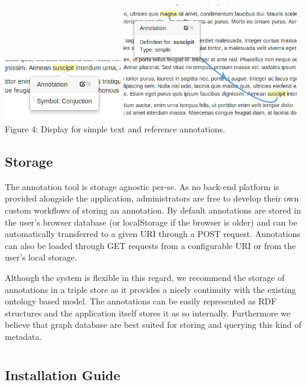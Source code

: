 \documentclass[a4paper, 12pt, notitlepage]{report}
\begin{document}
\begin{center}
\includegraphics[width=2in]{suscipit.png} \includegraphics[width=3in]{definition.png}\\
\tiny{Figure 4: Display for simple text and reference annotations.}
\end{center}

\section{Storage}
The annotation tool is storage agnostic per-se. As no back-end platform is provided
alongside the application, administrators are free to develop their own custom workflows
of storing an annotation. By default annotations are stored in the user's browser database
(or localStorage if the browser is older) and can be automatically transferred to a given
URI through a POST request. Annotations can also be loaded through GET requests from a
configurable URI or from the user's local storage.

Although the system is flexible in this regard, we recommend the storage of annotations in
a triple store as it provides a nicely continuity with the existing ontology based model.
The annotations can be easily represented as RDF structures and the application itself
stores it as so internally. Furthermore we believe that graph database are best suited for
storing and querying this kind of metadata.
\appendix
\chapter{}

\section{Installation Guide}
\end{document}

